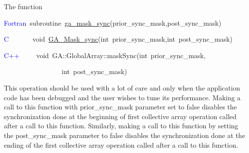 The function
\begin{lyxcode}
\textcolor{blue}{Fortran}~subroutine~\href{http://www.emsl.pnl.gov/docs/global/ga_ops.html\#ga_mask_sync}{ga\_{}mask\_{}sync}(prior\_sync\_mask,post\_sync\_mask)

\textcolor{blue}{C}~~~~~~~void~\href{http://www.emsl.pnl.gov/docs/global/c_nga_ops.html\#ga_mask_sync}{GA\_{}Mask\_{}sync}(int~prior\_sync\_mask,int~post\_sync\_mask)

\textcolor{blue}{C++}~~~~~void~GA::GlobalArray::maskSync(int~prior\_sync\_mask,

~~~~~~~~~~~~~~~~~int~post\_sync\_mask)
\end{lyxcode}
This operation should be used with a lot of care and only when the
application code has been debugged and the user wishes to tune its
performance. Making a call to this function with prior\_sync\_mask
parameter set to false disables the synchronization done at the beginning
of first collective array operation called after a call to this function.
Similarly, making a call to this function by setting the post\_sync\_mask
parameter to false disables the synchronization done at the ending
of the first collective array operation called after a call to this
function.
